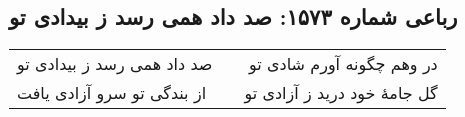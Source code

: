 \begin{center}
\section*{رباعی شماره ۱۵۷۳: صد داد همی رسد ز بیدادی تو}
\label{sec:1573}
\begin{longtable}{l p{0.5cm} r}
صد داد همی رسد ز بیدادی تو
&&
در وهم چگونه آورم شادی تو
\\
از بندگی تو سرو آزادی یافت
&&
گل جامهٔ خود درید ز آزادی تو
\\
\end{longtable}
\end{center}
